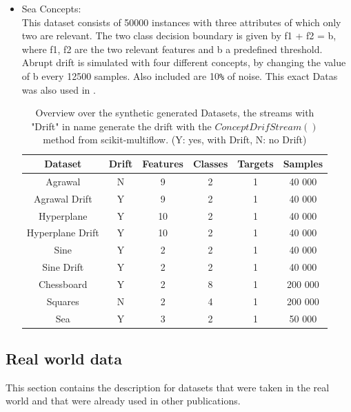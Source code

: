 \documentclass[12pt,oneside,a4paper,parskip]{scrbook}
\begin{document}
\begin{itemize}
  \item Sea Concepts: \\
        This dataset consists of 50000 instances with three attributes of which only two are relevant. 
        The two class decision boundary is given by f1 + f2 = b, where f1, f2 are the two relevant features and b a
        predefined threshold. Abrupt drift is simulated with four different concepts, by changing the value of b every 
        12500 samples. Also included are 10\verb|%| of noise. 
        This exact Datas was also used in \cite{SEADataset}.

        \begin{table}[H]
          \label{tab:synthdata}
          \centering
          \begin{tabular} {|| c c c c c c ||} 
            \hline
              Dataset & Drift &Features & Classes & Targets & Samples \\
            \hline\hline
              Agrawal & N & 9 & 2 & 1 & 40 000 \\
            \hline
              Agrawal Drift & Y & 9 & 2 & 1 & 40 000 \\
            \hline 
              Hyperplane & Y & 10 & 2 & 1 & 40 000 \\
            \hline 
              Hyperplane Drift & Y & 10 & 2 & 1 & 40 000 \\
            \hline
              Sine & Y & 2 & 2 & 1 & 40 000 \\
            \hline
              Sine Drift & Y & 2 & 2 & 1 & 40 000 \\
            \hline
              Chessboard & Y & 2 & 8 & 1 & 200 000 \\
            \hline
              Squares & N & 2 & 4 & 1 & 200 000 \\
            \hline
              Sea & Y & 3 & 2 & 1 & 50 000 \\
            \hline
          \end{tabular} 
          \caption{Overview over the synthetic generated Datasets, the streams with "Drift" in name generate the drift
          with the $ConceptDrifStream()$ method from scikit-multiflow. (Y: yes, with Drift, N: no Drift) }
        \end{table}
  
\end{itemize}

\subsection{Real world data}
This section contains the description for datasets that were taken in the real world and that were already used in other
publications. 
\end{document}
